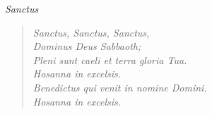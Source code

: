 \begin{center}
\itshape{Sanctus}
\end{center}

\small
\begin{verse}
\itshape{
Sanctus, Sanctus, Sanctus,\\
Dominus Deus Sabbaoth;\\
Pleni sunt caeli et terra gloria Tua.\\
Hosanna in excelsis.\\
Benedictus qui venit in nomine Domini.\\
Hosanna in excelsis.\\
}
\end{verse}
\normalsize
